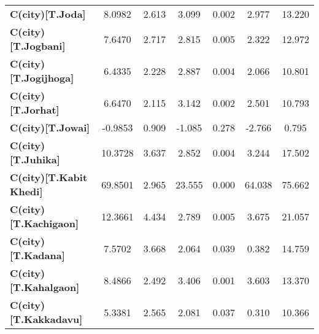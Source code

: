 \begin{center}
\begin{tabular}{lcccccc}
\textbf{C(city)[T.Joda]}                                                                            &       8.0982  &        2.613     &     3.099  &         0.002        &        2.977    &       13.220     \\
\textbf{C(city)[T.Jogbani]}                                                                         &       7.6470  &        2.717     &     2.815  &         0.005        &        2.322    &       12.972     \\
\textbf{C(city)[T.Jogijhoga]}                                                                       &       6.4335  &        2.228     &     2.887  &         0.004        &        2.066    &       10.801     \\
\textbf{C(city)[T.Jorhat]}                                                                          &       6.6470  &        2.115     &     3.142  &         0.002        &        2.501    &       10.793     \\
\textbf{C(city)[T.Jowai]}                                                                           &      -0.9853  &        0.909     &    -1.085  &         0.278        &       -2.766    &        0.795     \\
\textbf{C(city)[T.Juhika]}                                                                          &      10.3728  &        3.637     &     2.852  &         0.004        &        3.244    &       17.502     \\
\textbf{C(city)[T.Kabit Khedi]}                                                                     &      69.8501  &        2.965     &    23.555  &         0.000        &       64.038    &       75.662     \\
\textbf{C(city)[T.Kachigaon]}                                                                       &      12.3661  &        4.434     &     2.789  &         0.005        &        3.675    &       21.057     \\
\textbf{C(city)[T.Kadana]}                                                                          &       7.5702  &        3.668     &     2.064  &         0.039        &        0.382    &       14.759     \\
\textbf{C(city)[T.Kahalgaon]}                                                                       &       8.4866  &        2.492     &     3.406  &         0.001        &        3.603    &       13.370     \\
\textbf{C(city)[T.Kakkadavu]}                                                                       &       5.3381  &        2.565     &     2.081  &         0.037        &        0.310    &       10.366     \\

\end{tabular}
\end{center}
